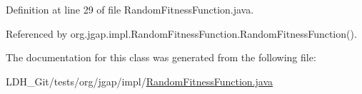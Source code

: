 Definition at line 29 of file Random\-Fitness\-Function.\-java.



Referenced by org.\-jgap.\-impl.\-Random\-Fitness\-Function.\-Random\-Fitness\-Function().



The documentation for this class was generated from the following file\-:\begin{DoxyCompactItemize}
\item 
L\-D\-H\-\_\-\-Git/tests/org/jgap/impl/\hyperlink{_random_fitness_function_8java}{Random\-Fitness\-Function.\-java}\end{DoxyCompactItemize}
